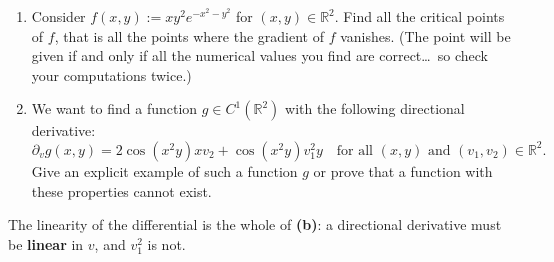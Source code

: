 \begin{exercise}
\label{ex:directional_derivatives_computation}
\begin{enumerate}[label=\textbf{(\alph*)}]
  \item Consider $f(x,y) := xy^2e^{-x^2-y^2}$ for $(x,y) \in \mathbb{R}^2$. Find all the critical
    points of $f$, that is all the points where the gradient of $f$ vanishes. (The point will be
    given if and only if all the numerical values you find are correct\ldots\ so check your
    computations twice.)
  \item We want to find a function $g \in C^1(\mathbb{R}^2)$ with the following directional
    derivative:
    \[\partial_v g(x,y) = 2\cos(x^2y)xv_2 + \cos(x^2y)v_1^2y \quad \text{for all } (x,y) \text{ and } (v_1,v_2) \in \mathbb{R}^2.\]
    Give an explicit example of such a function $g$ or prove that a function with these
    properties cannot exist.
\end{enumerate}
\end{exercise}

\begin{remark}
The linearity of the differential is the whole of
\textbf{(b)}: a directional derivative must be \textbf{linear} in $v$, and $v_1^2$ is not.
\end{remark}


